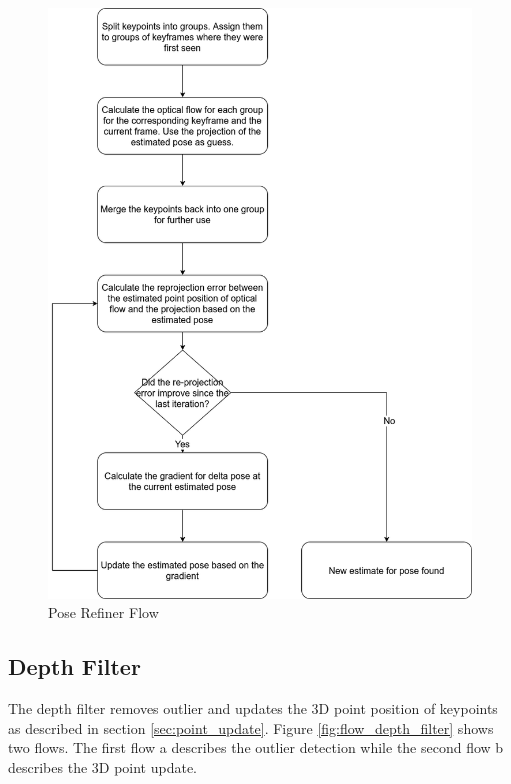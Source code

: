\documentclass[11pt,a4paper,titlepage,oneside]{report}
\begin{document}
\begin{figure}[H]
  \centering
  \includegraphics[scale=0.3]{img/flow_pose_refiner.png}
  \caption{Pose Refiner Flow}\label{fig:flow_pose_refiner}
\end{figure}

\subsection{Depth Filter}\label{sec:depth_filter}

The depth filter removes outlier and updates the 3D point position of keypoints as described in section \ref{sec:point_update}. Figure \ref{fig:flow_depth_filter} shows two flows. The first flow a describes the outlier detection while the second flow b describes the 3D point update.
\end{document}
